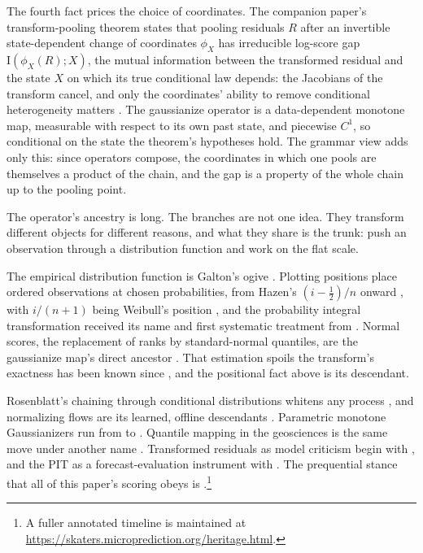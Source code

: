 \documentclass[11pt]{article}
\theoremstyle{remark}
\newcommand{\I}{\mathrm{I}}
\begin{document}
The fourth fact prices the choice of coordinates. The companion paper's transform-pooling
theorem states that pooling residuals $R$ after an invertible state-dependent change of
coordinates $\phi_X$ has irreducible log-score gap $\I(\phi_X(R); X)$, the mutual
information between the transformed residual and the state $X$ on which its true
conditional law depends: the Jacobians of the
transform cancel, and only the coordinates' ability to remove conditional heterogeneity
matters \citep{cotton2026gap}. The gaussianize operator is a data-dependent monotone map,
measurable with respect to its own past state, and piecewise $C^1$, so conditional on the
state the theorem's hypotheses hold. The grammar view adds only this: since operators
compose, the coordinates in which one pools are themselves a product of the chain, and the
gap is a property of the whole chain up to the pooling point.

The operator's ancestry is long. The
branches are not one idea. They transform different objects for different reasons, and
what they share is the trunk: push an observation through a distribution function and
work on the flat scale.

The
empirical distribution function is Galton's ogive \citep{galton1875}. Plotting positions
place ordered observations at chosen probabilities, from Hazen's $(i - \tfrac12)/n$
onward \citep{hazen1914}, with $i/(n+1)$ being Weibull's position
\citep{weibull1939}, and
the probability integral transformation received its name and first systematic treatment
from \citet{pearson1938}. Normal scores, the replacement of ranks by standard-normal
quantiles, are the gaussianize map's direct ancestor \citep{vanderwaerden1952}. That
estimation spoils the transform's exactness has been known since
\citet{davidjohnson1948}, and the positional fact above is its descendant.

Rosenblatt's
chaining through conditional distributions whitens any process
\citep{rosenblatt1952remarks}, and normalizing flows are its learned, offline
descendants \citep{tabak2010,papamakarios2021normalizing}. Parametric monotone
Gaussianizers run from \citet{boxcox1964} to \citet{yeojohnson2000}. Quantile
mapping in the geosciences is the same move under another name
\citep{panofskybrier1968}. Transformed residuals as model criticism begin with
\citet{coxsnell1968}, and the PIT as a forecast-evaluation instrument with
\citet{diebold1998evaluating}. The prequential stance that all of this paper's
scoring obeys is \citet{dawid1984present}.\footnote{A fuller annotated timeline is maintained at
\url{https://skaters.microprediction.org/heritage.html}.}
\end{document}
